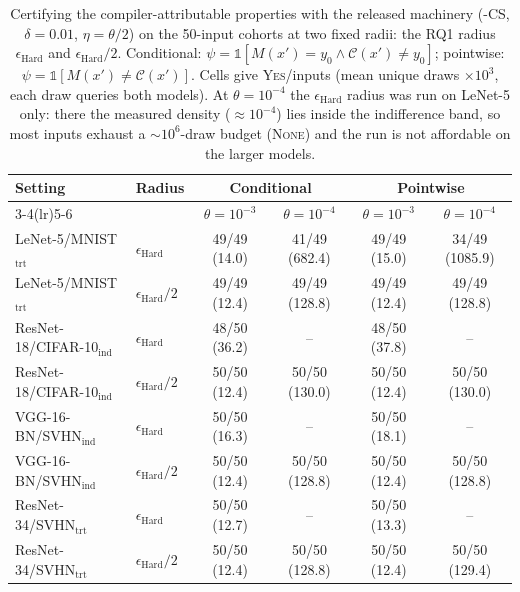 \begin{table}[t]
{\color{red}%
\centering\scriptsize
\setlength{\tabcolsep}{3.5pt}
\caption{Certifying the compiler-attributable properties with the released machinery (\tool-CS, $\delta=0.01$, $\eta=\theta/2$) on the 50-input cohorts at two fixed radii: the RQ1 radius $\epsilon_{\mathrm{Hard}}$ and $\epsilon_{\mathrm{Hard}}/2$. Conditional: $\psi=\mathbb{1}[M(x')=y_0\wedge\mathcal{C}(x')\neq y_0]$; pointwise: $\psi=\mathbb{1}[M(x')\neq\mathcal{C}(x')]$. Cells give \textsc{Yes}/inputs (mean unique draws $\times10^3$, each draw queries both models). At $\theta=10^{-4}$ the $\epsilon_{\mathrm{Hard}}$ radius was run on LeNet-5 only: there the measured density ($\approx10^{-4}$) lies inside the indifference band, so most inputs exhaust a $\sim10^{6}$-draw budget (\textsc{None}) and the run is not affordable on the larger models.}
\label{tab:cond}
\begin{tabular}{ll cc cc}
\toprule
Setting & Radius & \multicolumn{2}{c}{Conditional} & \multicolumn{2}{c}{Pointwise} \\
\cmidrule(lr){3-4}\cmidrule(lr){5-6}
& & $\theta=10^{-3}$ & $\theta=10^{-4}$ & $\theta=10^{-3}$ & $\theta=10^{-4}$ \\
\midrule
LeNet-5/MNIST$_{\mathrm{trt}}$ & $\epsilon_{\mathrm{Hard}}$ & 49/49 (14.0) & 41/49 (682.4) & 49/49 (15.0) & 34/49 (1085.9) \\
LeNet-5/MNIST$_{\mathrm{trt}}$ & $\epsilon_{\mathrm{Hard}}/2$ & 49/49 (12.4) & 49/49 (128.8) & 49/49 (12.4) & 49/49 (128.8) \\
ResNet-18/CIFAR-10$_{\mathrm{ind}}$ & $\epsilon_{\mathrm{Hard}}$ & 48/50 (36.2) & -- & 48/50 (37.8) & -- \\
ResNet-18/CIFAR-10$_{\mathrm{ind}}$ & $\epsilon_{\mathrm{Hard}}/2$ & 50/50 (12.4) & 50/50 (130.0) & 50/50 (12.4) & 50/50 (130.0) \\
VGG-16-BN/SVHN$_{\mathrm{ind}}$ & $\epsilon_{\mathrm{Hard}}$ & 50/50 (16.3) & -- & 50/50 (18.1) & -- \\
VGG-16-BN/SVHN$_{\mathrm{ind}}$ & $\epsilon_{\mathrm{Hard}}/2$ & 50/50 (12.4) & 50/50 (128.8) & 50/50 (12.4) & 50/50 (128.8) \\
ResNet-34/SVHN$_{\mathrm{trt}}$ & $\epsilon_{\mathrm{Hard}}$ & 50/50 (12.7) & -- & 50/50 (13.3) & -- \\
ResNet-34/SVHN$_{\mathrm{trt}}$ & $\epsilon_{\mathrm{Hard}}/2$ & 50/50 (12.4) & 50/50 (128.8) & 50/50 (12.4) & 50/50 (129.4) \\
\bottomrule
\end{tabular}%
}
\end{table}
